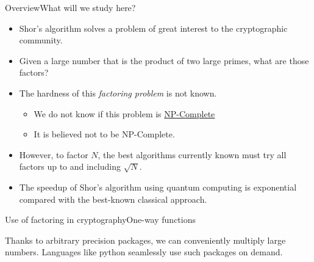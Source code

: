 
\begin{frame}{Overview}{What will we study here?}

\begin{itemize}
    \item Shor's algorithm solves a problem of great interest to the cryptographic community.
    \item Given a large number that is the product of two large primes, what are those factors?
    \item The hardness of this \emph{factoring problem} is not known.
    \begin{itemize}
        \item We do not know if this problem is \href{https://en.wikipedia.org/wiki/NP-completeness}{NP-Complete}
        \item It is believed not to be NP-Complete.
    \end{itemize}
    \item However, to factor $N$, the best algorithms currently known must try all factors up to and including $\sqrt{N}$.
    \item The speedup of Shor's algorithm using quantum computing is exponential compared with the best-known classical approach.
\end{itemize}
    
\end{frame}

\begin{frame}{Use of factoring in cryptography}{One-way functions}

\BigSkip{}%
Thanks to arbitrary precision packages, we can conveniently multiply large numbers.  Languages like python seamlessly use such packages on demand.
\end{frame}

